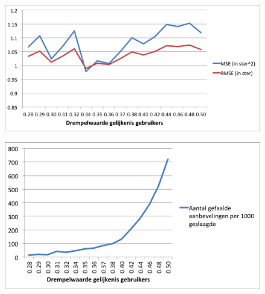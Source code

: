 \begin{figure}[htpb]   
    \label{Figuur::mse_rmse}      
  \begin{center}    
 \includegraphics[width=\textwidth]{fig/mse_rmse}    
  \end{center}   
\end{figure}
   
\begin{figure}[htpb]   
    \label{Figuur::failed}      
  \begin{center}    
 \includegraphics[width=\textwidth]{fig/failed}    
  \end{center}   
\end{figure}

